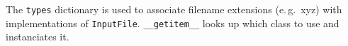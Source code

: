 The \texttt{types} dictionary is used to associate filename extensions (e.\,g.\ xyz) with implementations of \texttt{InputFile}.
\texttt{\_\_getitem\_\_} looks up which class to use and instanciates it.

